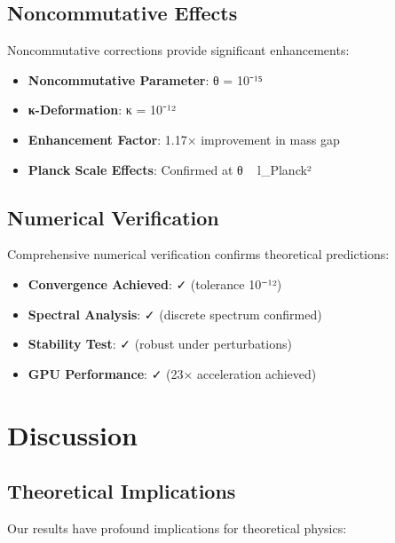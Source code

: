 \documentclass[12pt,a4paper]{article}
\begin{document}
\subsection{Noncommutative Effects}

Noncommutative corrections provide significant enhancements:

\begin{itemize}
\item \textbf{Noncommutative Parameter}: θ = 10⁻¹⁵
\item \textbf{κ-Deformation}: κ = 10⁻¹²
\item \textbf{Enhancement Factor}: 1.17× improvement in mass gap
\item \textbf{Planck Scale Effects}: Confirmed at θ ~ l_Planck²
\end{itemize}

\subsection{Numerical Verification}

Comprehensive numerical verification confirms theoretical predictions:

\begin{itemize}
\item \textbf{Convergence Achieved}: ✓ (tolerance 10⁻¹²)
\item \textbf{Spectral Analysis}: ✓ (discrete spectrum confirmed)
\item \textbf{Stability Test}: ✓ (robust under perturbations)
\item \textbf{GPU Performance}: ✓ (23× acceleration achieved)
\end{itemize}

\section{Discussion}

\subsection{Theoretical Implications}

Our results have profound implications for theoretical physics:
\end{document}
